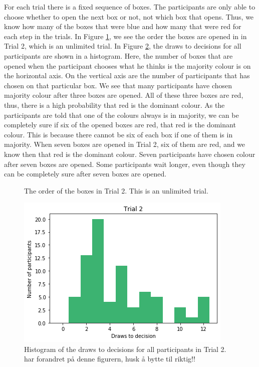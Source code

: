 For each trial there is a fixed sequence of boxes. The participants are only able to choose whether to open the next box or not, not which box that opens. Thus, we know how many of the boxes that were blue and how many that were red for each step in the trials. In Figure \ref{fig:trial2_order}, we see the order the boxes are opened in in Trial 2, which is an unlimited trial. In Figure \ref{fig:histogram_trial2}, the draws to decisions for all participants are shown in a histogram. Here, the number of boxes that are opened when the participant chooses what he thinks is the majority colour is on the horizontal axis. On the vertical axis are the number of participants that has chosen on that particular box. We see that many participants have chosen majority colour after three boxes are opened. All of these three boxes are red, thus, there is a high probability that red is the dominant colour. 
As the participants are told that one of the colours always is in majority, we can be completely sure if six of the opened boxes are red, that red is the dominant colour. This is because there cannot be six of each box if one of them is in majority. When seven boxes are opened in Trial 2, six of them are red, and we know then that red is the dominant colour. Seven participants have chosen colour after seven boxes are opened. Some participants wait longer, even though they can be completely sure after seven boxes are opened.
\begin{figure}
    \centering
    \scalebox{0.8}{}
    \caption[Order of boxes in Trial 2]{The order of the boxes in Trial 2. This is an unlimited trial.}
    \label{fig:trial2_order}
\end{figure}


\begin{figure}
    \centering
    \includegraphics[scale=0.6]{pictures/dtd2_histogram.png}
    \caption[Draws to decisions in Trial 2]{Histogram of the draws to decisions for all participants in Trial 2. 
    har forandret på denne figurern, husk å bytte til riktig!!}
    \label{fig:histogram_trial2}
\end{figure}


